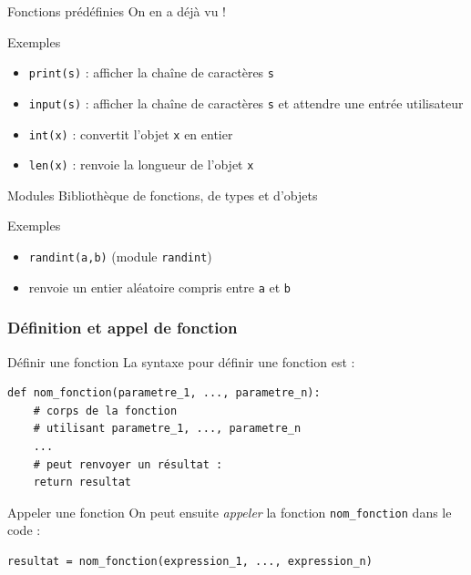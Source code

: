 \documentclass{beamer}
\begin{document}
\begin{frame}{Fonctions prédéfinies}
  \MVRightarrow{} On en a déjà vu !

  \begin{exampleblock}{Exemples}
    \begin{itemize}
    \pause
  \item \texttt{print(s)} : afficher la chaîne de caractères \texttt{s}
  \item \texttt{input(s)} : afficher la chaîne de caractères \texttt{s} et attendre une entrée utilisateur
  \item \texttt{int(x)} : convertit l'objet \texttt{x} en entier
  \item \texttt{len(x)} : renvoie la longueur de l'objet \texttt{x}
  \end{itemize}
\end{exampleblock}

\pause

\begin{block}{Modules}
  \vspace{0pt}
  Bibliothèque de fonctions, de types et d'objets
\end{block}

\begin{exampleblock}{Exemples}
  \pause
  \begin{itemize}
  \item \texttt{randint(a,b)} (module \texttt{randint})
  \item[\MVRightarrow{}] renvoie un entier aléatoire compris entre \texttt{a} et \texttt{b}
  \end{itemize}
  \end{exampleblock}
  
\end{frame}

\begin{frame}[fragile]
  \frametitle{Définition et appel de fonction}

  \begin{block}{Définir une fonction}
    \vspace{0pt}
    La syntaxe pour définir une fonction est :
    
\begin{verbatim}
def nom_fonction(parametre_1, ..., parametre_n):
    # corps de la fonction
    # utilisant parametre_1, ..., parametre_n
    ...
    # peut renvoyer un résultat :
    return resultat
\end{verbatim}
  \end{block}
  \pause
  \begin{block}{Appeler une fonction}
    \vspace{0pt}
    On peut ensuite \emph{appeler} la fonction \texttt{nom_fonction} dans le code :
\begin{verbatim}
resultat = nom_fonction(expression_1, ..., expression_n)
\end{verbatim}
  \end{block}
\end{frame}
\end{document}
